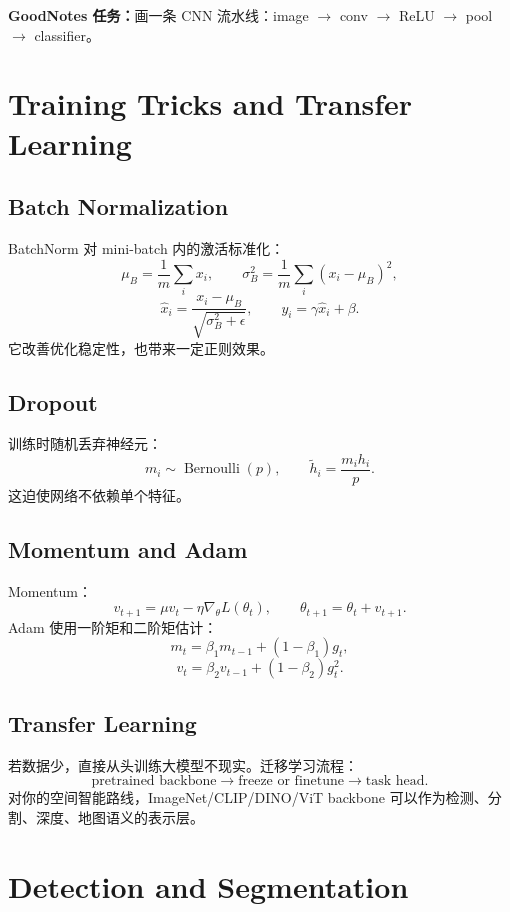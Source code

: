 \documentclass[11pt]{article}
\newcommand{\goodnotes}[1]{\textbf{GoodNotes 任务：}#1}
\begin{document}
\goodnotes{画一条 CNN 流水线：image $\rightarrow$ conv $\rightarrow$ ReLU $\rightarrow$ pool $\rightarrow$ classifier。}

\section{Training Tricks and Transfer Learning}

\subsection{Batch Normalization}

BatchNorm 对 mini-batch 内的激活标准化：
\[
  \mu_B=\frac{1}{m}\sum_i x_i,
\qquad
  \sigma_B^2=\frac{1}{m}\sum_i (x_i-\mu_B)^2,
\]
\[
  \hat x_i=\frac{x_i-\mu_B}{\sqrt{\sigma_B^2+\epsilon}},
\qquad
  y_i=\gamma \hat x_i+\beta.
\]
它改善优化稳定性，也带来一定正则效果。

\subsection{Dropout}

训练时随机丢弃神经元：
\[
  m_i\sim \operatorname{Bernoulli}(p),
\qquad
  \tilde h_i=\frac{m_i h_i}{p}.
\]
这迫使网络不依赖单个特征。

\subsection{Momentum and Adam}

Momentum：
\[
  v_{t+1}=\mu v_t-\eta\nabla_\theta L(\theta_t),
\qquad
  \theta_{t+1}=\theta_t+v_{t+1}.
\]
Adam 使用一阶矩和二阶矩估计：
\[
  m_t=\beta_1m_{t-1}+(1-\beta_1)g_t,
\]
\[
  v_t=\beta_2v_{t-1}+(1-\beta_2)g_t^2.
\]

\subsection{Transfer Learning}

若数据少，直接从头训练大模型不现实。迁移学习流程：
\[
  \text{pretrained backbone}\rightarrow \text{freeze or finetune}\rightarrow \text{task head}.
\]
对你的空间智能路线，ImageNet/CLIP/DINO/ViT backbone 可以作为检测、分割、深度、地图语义的表示层。

\section{Detection and Segmentation}
\end{document}

